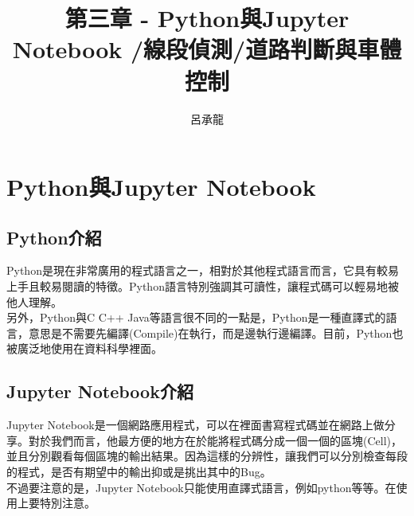 \documentclass{article}
\title{第三章 - Python與Jupyter Notebook /線段偵測/道路判斷與車體控制}
\author{呂承龍}
\date{} %
\begin{document}
\maketitle

\section{Python與Jupyter Notebook}
\subsection{Python介紹}
Python是現在非常廣用的程式語言之一，相對於其他程式語言而言，它具有較易上手且較易閱讀的特徵。Python語言特別強調其可讀性，讓程式碼可以輕易地被他人理解。
\\另外，Python與C C++ Java等語言很不同的一點是，Python是一種直譯式的語言，意思是不需要先編譯(Compile)在執行，而是邊執行邊編譯。目前，Python也被廣泛地使用在資料科學裡面。

\subsection{Jupyter Notebook介紹}
Jupyter Notebook是一個網路應用程式，可以在裡面書寫程式碼並在網路上做分享。對於我們而言，他最方便的地方在於能將程式碼分成一個一個的區塊(Cell)，並且分別觀看每個區塊的輸出結果。因為這樣的分辨性，讓我們可以分別檢查每段的程式，是否有期望中的輸出抑或是挑出其中的Bug。
\\不過要注意的是，Jupyter Notebook只能使用直譯式語言，例如python等等。在使用上要特別注意。
\end{document}
